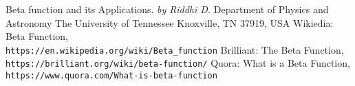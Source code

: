 \documentclass[10pt]{article}
\begin{document}
\begin{thebibliography}{}
Beta function and its Applications.
\textit{by Riddhi D.}
Department of Physics and Astronomy
The University of Tennessee
Knoxville, TN 37919, USA
Wikiedia: Beta Function,
\\\texttt{https://en.wikipedia.org/wiki/Beta\_function}
Brilliant: The Beta Function,
\\\texttt{https://brilliant.org/wiki/beta-function/}
Quora: What is a Beta Function,
\\\texttt{https://www.quora.com/What-is-beta-function}
\end{thebibliography}
\end{document}
